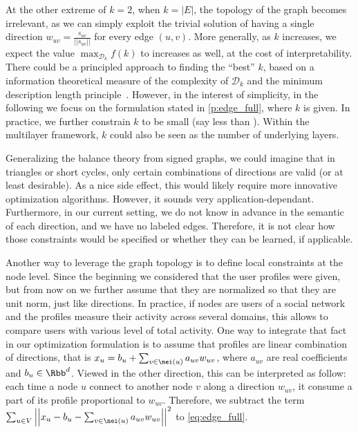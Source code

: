 \bigskip

At the other extreme of $k=2$, when $k=|E|$, the topology of the graph becomes irrelevant,
as we can simply exploit the trivial
solution of having a single direction $w_{uv} = \frac{s_{uv}}{||s_{uv}||}$ for every edge $(u,v)$.
More generally, as $k$ increases, we expect the value $\max_{\mathcal{D}_k} f(k)$ to increases as
well, at the cost of interpretability. There could be a principled approach to finding the
\enquote{best} $k$, based on a information theoretical measure of the complexity of $\mathcal{D}_k$
and the minimum description length principle~\autocite{grunwald2005tutorial}. However, in the
interest of simplicity, in the following we focus on the formulation stated in
\autoref{p:edge_full}, where $k$ is given. In practice, we further constrain $k$ to be small (say
less than ). Within the multilayer framework, $k$ could also be seen as the number of
underlying layers.

\begin{aside}
Generalizing the balance theory from signed graphs, we could imagine that in triangles or short
cycles, only certain combinations of directions are valid (or at least desirable). As a nice side
effect, this would likely require more innovative optimization algorithms. However, it sounds very
application-dependant. Furthermore, in our current setting, we do not know in advance in the
semantic of each direction, and we have no labeled edges. Therefore, it is not clear how those
constraints would be specified or whether they can be learned, if applicable. 
\end{aside}

Another way to leverage the graph topology is to define local constraints at the node level. Since
the beginning we considered that the user profiles were given, but from now on we further assume
that they are normalized so that they are unit norm, just like directions. In practice, if nodes are
users of a social network and the profiles measure their activity across several domains, this
allows to compare users with various level of total activity. One way to integrate that fact in
our optimization formulation is to assume that profiles are linear combination of directions, that
is $x_u = b_u + \sum_{v \in \nei(u)} a_{uv} w_{uv}$, where $a_{uv}$ are real coefficients and $b_u
\in \Rbb^d$. Viewed in the other direction, this can be interpreted as follow: each time a node $u$
connect to another node $v$ along a direction $w_{uv}$, it consume a part of its profile
proportional to $w_{uv}$. Therefore, we subtract the term $\sum_{u\in V} \left|\left| x_u - b_u -
\sum_{v \in \nei(u)} a_{uv} w_{uv} \right|\right|^2$ to \eqref{eq:edge_full}.

